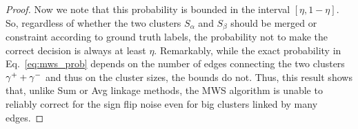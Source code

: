 \begin{proof}
Now we note that this probability is bounded in the interval $[\eta, 1-\eta]$. So, regardless of whether the two clusters $S_\alpha$ and $S_\beta$ should be merged or constraint according to ground truth labels, the probability not to make the correct decision is always at least $\eta$.
Remarkably, while the exact probability in Eq.~\ref{eq:mws_prob} depends on the number of edges connecting the two clusters $\gamma^++\gamma^-$ and thus on the cluster sizes, the bounds do not. Thus, this result shows that, unlike Sum or Avg linkage methods, the MWS algorithm is unable to reliably correct for the sign flip noise even for big clusters linked by many edges.
\end{proof}





